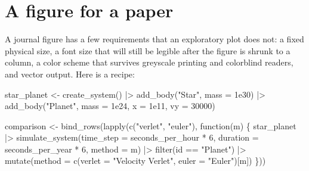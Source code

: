 \documentclass[
  10.5pt,
  letterpaper,
]{scrbook}
\newenvironment{Shaded}{\begin{snugshade}}{\end{snugshade}}
\newcommand{\AttributeTok}[1]{\textcolor[rgb]{0.00,0.00,0.00}{#1}}
\newcommand{\ControlFlowTok}[1]{\textcolor[rgb]{0.00,0.00,0.00}{#1}}
\newcommand{\DecValTok}[1]{\textcolor[rgb]{0.00,0.00,0.00}{#1}}
\newcommand{\FloatTok}[1]{\textcolor[rgb]{0.00,0.00,0.00}{#1}}
\newcommand{\FunctionTok}[1]{\textcolor[rgb]{0.00,0.00,0.00}{#1}}
\newcommand{\NormalTok}[1]{\textcolor[rgb]{0.00,0.00,0.00}{#1}}
\newcommand{\OtherTok}[1]{\textcolor[rgb]{0.00,0.00,0.00}{#1}}
\newcommand{\SpecialCharTok}[1]{\textcolor[rgb]{0.00,0.00,0.00}{#1}}
\newcommand{\StringTok}[1]{\textcolor[rgb]{0.00,0.00,0.00}{#1}}
\theoremstyle{plain}
\theoremstyle{remark}
\begin{document}
\section{A figure for a paper}\label{a-figure-for-a-paper}

A journal figure has a few requirements that an exploratory plot does
not: a fixed physical size, a font size that will still be legible after
the figure is shrunk to a column, a color scheme that survives greyscale
printing and colorblind readers, and vector output. Here is a recipe:

\begin{Shaded}
\begin{Highlighting}[]
\NormalTok{star\_planet }\OtherTok{\textless{}{-}} \FunctionTok{create\_system}\NormalTok{() }\SpecialCharTok{|\textgreater{}}
  \FunctionTok{add\_body}\NormalTok{(}\StringTok{"Star"}\NormalTok{,   }\AttributeTok{mass =} \FloatTok{1e30}\NormalTok{) }\SpecialCharTok{|\textgreater{}}
  \FunctionTok{add\_body}\NormalTok{(}\StringTok{"Planet"}\NormalTok{, }\AttributeTok{mass =} \FloatTok{1e24}\NormalTok{, }\AttributeTok{x =} \FloatTok{1e11}\NormalTok{, }\AttributeTok{vy =} \DecValTok{30000}\NormalTok{)}

\NormalTok{comparison }\OtherTok{\textless{}{-}} \FunctionTok{bind\_rows}\NormalTok{(}\FunctionTok{lapply}\NormalTok{(}\FunctionTok{c}\NormalTok{(}\StringTok{"verlet"}\NormalTok{, }\StringTok{"euler"}\NormalTok{), }\ControlFlowTok{function}\NormalTok{(m) \{}
\NormalTok{  star\_planet }\SpecialCharTok{|\textgreater{}}
    \FunctionTok{simulate\_system}\NormalTok{(}\AttributeTok{time\_step =}\NormalTok{ seconds\_per\_hour }\SpecialCharTok{*} \DecValTok{6}\NormalTok{,}
                    \AttributeTok{duration =}\NormalTok{ seconds\_per\_year }\SpecialCharTok{*} \DecValTok{6}\NormalTok{, }\AttributeTok{method =}\NormalTok{ m) }\SpecialCharTok{|\textgreater{}}
    \FunctionTok{filter}\NormalTok{(id }\SpecialCharTok{==} \StringTok{"Planet"}\NormalTok{) }\SpecialCharTok{|\textgreater{}}
    \FunctionTok{mutate}\NormalTok{(}\AttributeTok{method =} \FunctionTok{c}\NormalTok{(}\AttributeTok{verlet =} \StringTok{"Velocity Verlet"}\NormalTok{, }\AttributeTok{euler =} \StringTok{"Euler"}\NormalTok{)[m])}
\NormalTok{\}))}


\end{Highlighting}
\end{Shaded}
\end{document}
